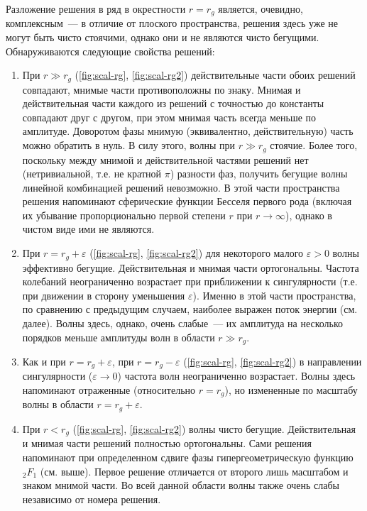 \documentclass[\docroot/reports/draft/report.tex]{subfiles}
\begin{document}
        Разложение решения в ряд в окрестности $r = r_g$ является, очевидно, комплексным~--- в отличие от плоского пространства, решения здесь уже не могут быть чисто стоячими, однако они и не являются чисто бегущими. Обнаруживаются следующие свойства решений:
        \begin{enumerate}
            \item При $r \gg r_g$ (\autoref{fig:scal-rg}, \autoref{fig:scal-rg2}) действительные части обоих решений совпадают, мнимые части противоположны по знаку. Мнимая и действительная части каждого из решений с точностью до константы совпадают друг с другом, при этом мнимая часть всегда меньше по амплитуде. Доворотом фазы мнимую (эквивалентно, действительную) часть можно обратить в нуль. В силу этого, волны при $r \gg r_g$ стоячие. Более того, поскольку между мнимой и действительной частями решений нет (нетривиальной, т.е. не кратной $\pi$) разности фаз, получить бегущие волны линейной комбинацией решений невозможно. В этой части пространства решения напоминают сферические функции Бесселя первого рода (включая их убывание пропорционально первой степени $r$ при $r \to \infty$), однако в чистом виде ими не являются.
            \item При $r = r_g + \varepsilon$ (\autoref{fig:scal-rg}, \autoref{fig:scal-rg2}) для некоторого малого $\varepsilon > 0$ волны эффективно бегущие. Действительная и мнимая части ортогональны. Частота колебаний неограниченно возрастает при приближении к сингулярности (т.е. при движении в сторону уменьшения $\varepsilon$). Именно в этой части пространства, по сравнению с предыдущим случаем, наиболее выражен поток энергии (см. далее). Волны здесь, однако, очень слабые~--- их амплитуда на несколько порядков меньше амплитуды волн в области $r \gg r_g$.
            \item Как и при $r = r_g + \varepsilon$, при $r = r_g - \varepsilon$ (\autoref{fig:scal-rg}, \autoref{fig:scal-rg2}) в направлении сингулярности ($\varepsilon \to 0$) частота волн неограниченно возрастает. Волны здесь напоминают отраженные (относительно $r = r_g$), но измененные по масштабу волны в области $r = r_g + \varepsilon$.
            \item При $r < r_g$  (\autoref{fig:scal-rg}, \autoref{fig:scal-rg2}) волны чисто бегущие. Действительная и мнимая части решений полностью ортогональны. Сами решения напоминают при определенном сдвиге фазы гипергеометрическую функцию ${}_2 F_1$ (см. выше). Первое решение отличается от второго лишь масштабом и знаком мнимой части. Во всей данной области волны также очень слабы независимо от номера решения.
        \end{enumerate}
\end{document}
